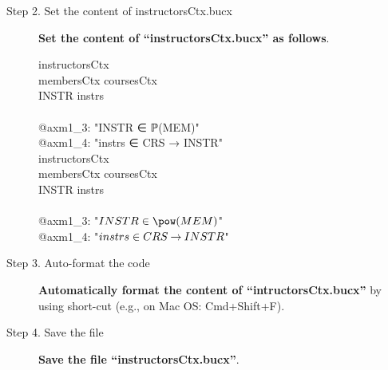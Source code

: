 \begin{description}
\item[Step 2. Set the content of instructorsCtx.bucx] \textbf{Set the content of ``instructorsCtx.bucx'' as follows}.
  \begin{center}
    \begin{Bcode}
      \ifplastex
      \Bcontext{} instructorsCtx\\
      \Bextends{} membersCtx coursesCtx\\
      \Bconstants{} INSTR instrs\\
      \Baxioms\\
      @axm1_3: "INSTR ∈ ℙ(MEM)"\\
      @axm1_4: "instrs ∈ CRS → INSTR"\\
      \Bend
      \else
      \Bcontext{} instructorsCtx\\
      \Bextends{} membersCtx coursesCtx\\
      \Bconstants{} INSTR instrs\\
      \Baxioms\\
      \Btab @axm1_3: "\(INSTR \in \pow(MEM)\)"\\
      \Btab @axm1_4: "\(instrs \in CRS \mathbin\rightarrow INSTR\)"\\
      \Bend
      \fi
    \end{Bcode}
  \end{center}

\item[Step 3. Auto-format the code] \textbf{Automatically format the content of ``intructorsCtx.bucx''} by using short-cut (e.g., on Mac OS: Cmd+Shift+F).

\item[Step 4. Save the file] \textbf{Save the file ``instructorsCtx.bucx''}.
\end{description}

